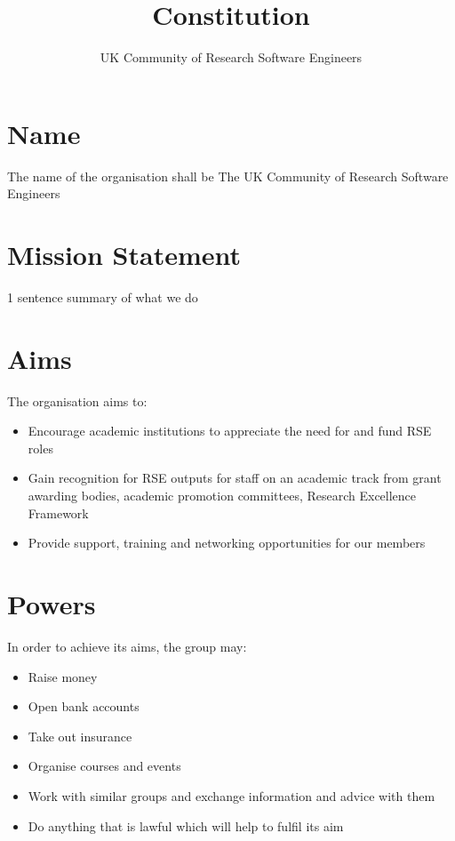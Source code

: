 \documentclass[a4paper, 12pt]{report}
\begin{document}
\title{Constitution}
\author{UK Community of Research Software Engineers}

\maketitle



\section{Name}

The name of the organisation shall be The UK Community of Research Software Engineers

\section{Mission Statement}

1 sentence summary of what we do

\section{Aims}

The organisation aims to:

\begin{itemize}
\item{Encourage academic institutions to appreciate the need for and fund RSE roles}
\item{Gain recognition for RSE outputs for staff on an academic track from grant awarding bodies, academic promotion committees, Research Excellence Framework }
\item{Provide support, training and networking opportunities for our members}
\end{itemize}

\section{Powers}

In order to achieve its aims, the group may:

\begin{itemize}
\item{Raise money}
\item{Open bank accounts}
\item{Take out insurance}
\item{Organise courses and events}
\item{Work with similar groups and exchange information and advice with them}
\item{Do anything that is lawful which will help to fulfil its aim}
\end{itemize}
\end{document}

